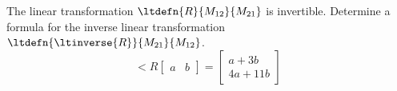 The linear transformation $\ltdefn{R}{M_{12}}{M_{21}}$ is invertible.  Determine a formula for the inverse linear transformation $\ltdefn{\ltinverse{R}}{M_{21}}{M_{12}}$.
\begin{equation*}
\lt{R}{\begin{bmatrix}a & b\end{bmatrix}}
=
\begin{bmatrix}
a+3b\\
4a+11b
\end{bmatrix}
\end{equation*}
%